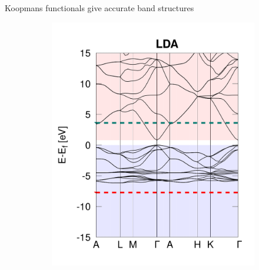 \documentclass[xcolor=table,aspectratio=169]{beamer}
\numberwithin{equation}{section}
\begin{document}
\begin{frame}{\normalsize Koopmans functionals give accurate band structures}
   \begin{figure}[t]
      \centering
      \begin{subfigure}{0.25\textwidth}
         \includegraphics[width=\columnwidth]{figures/ZnO_lda.png}
      \end{subfigure}
      \begin{subfigure}{0.25\textwidth}

\end{subfigure}
\end{figure}
\end{frame}
\end{document}
